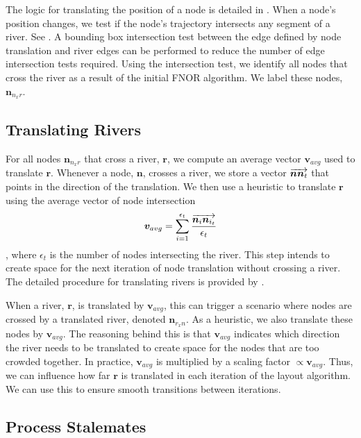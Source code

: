 \documentclass[Afour,sagev,times]{sagej}
\newcommand{\Vector}[1]{\protect\overrightarrow{#1}}
\newcommand{\nodeError}{\epsilon}
\newcommand{\nodeTopologicalError}{\nodeError_{t}}
\newcommand{\node}{\bm{n}}
\newcommand{\river}{\bm{r}}
\newcommand{\nodeVectorNNn}{\Vector{\node\node_{t}}}
\newcommand{\vectorAvg}{\bm{v}_{avg}}
\newcommand{\NxR}{\node_{n_{x}r}}
\newcommand{\RxN}{\node_{r_{x}n}}
\begin{document}
The logic for translating the position of a node is detailed in .
When a node's position changes, we test if the node's trajectory intersects any segment of a river.
See .
A bounding box intersection test between the edge defined by node translation and river edges can be performed to reduce the number of edge intersection tests required.
Using the intersection test, we identify all nodes that cross the river as a result of the initial FNOR algorithm.
We label these nodes, $ \NxR $.

\subsection{Translating Rivers}
\label{subsec:{Translating Rivers}}

For all nodes $ \NxR $ that cross a river, $ \river $, we compute an average vector $ \vectorAvg $ used to translate $ \river $.
Whenever a node, $ \node $, crosses a river, we store a vector $ \nodeVectorNNn $ that points in the direction of the translation.
We then use a heuristic to translate $ \river $ using the average vector of node intersection $$ \vectorAvg = \sum_{i=1}^{\nodeTopologicalError} \frac{\Vector{\node_i\node_{i_t}}}{\nodeTopologicalError} $$, where $ \nodeTopologicalError $ is the number of nodes intersecting the river.
This step intends to create space for the next iteration of node translation without crossing a river.
The detailed procedure for translating rivers is provided by .


When a river, $ \river $, is translated by $ \vectorAvg $, this can trigger a scenario where nodes are crossed by a translated river, denoted $ \RxN $.
As a heuristic, we also translate these nodes by $ \vectorAvg $.
The reasoning behind this is that $ \vectorAvg $ indicates which direction the river needs to be translated to create space for the nodes that are too crowded together.
In practice, $ \vectorAvg $ is multiplied by a scaling factor $ \propto\vectorAvg $.
Thus, we can influence how far $ \river $ is translated in each iteration of the layout algorithm.
We can use this to ensure smooth transitions between iterations.

\subsection{Process Stalemates}
\label{subsec:{Process Stalemates}}
\end{document}
